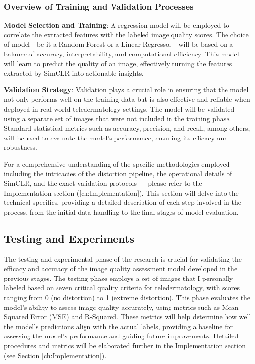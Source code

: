 \subsubsection{Overview of Training and Validation Processes}
\label{subsub:OverciewTrainVal}
\textbf{Model Selection and Training}: A regression model will be employed to correlate the extracted features with the labeled image quality scores. The choice of model—be it a Random Forest or a Linear Regressor—will be based on a balance of accuracy, interpretability, and computational efficiency. This model will learn to predict the quality of an image, effectively turning the features extracted by SimCLR into actionable insights. \par 
\noindent
\textbf{Validation Strategy}: Validation plays a crucial role in ensuring that the model not only performs well on the training data but is also effective and reliable when deployed in real-world teledermatology settings. The model will be validated using a separate set of images that were not included in the training phase. Standard statistical metrics such as accuracy, precision, and recall, among others, will be used to evaluate the model’s performance, ensuring its efficacy and robustness.\par
\vspace{\baselineskip}
\noindent
For a comprehensive understanding of the specific methodologies employed — including the intricacies of the distortion pipeline, the operational details of SimCLR, and the exact validation protocols — please refer to the Implementation section (\autoref{ch:Implementation}). This section will delve into the technical specifics, providing a detailed description of each step involved in the process, from the initial data handling to the final stages of model evaluation. \par 


\subsection{Testing and Experiments}
\label{sub:TestExperiment}
The testing and experimental phase of the research is crucial for validating the efficacy and accuracy of the image quality assessment model developed in the previous stages. The testing phase employs a set of images that I personally labeled based on seven critical quality criteria for teledermatology, with scores ranging from 0 (no distortion) to 1 (extreme distortion). This phase evaluates the model’s ability to assess image quality accurately, using metrics such as Mean Squared Error (MSE) and R-Squared. These metrics will help determine how well the model's predictions align with the actual labels, providing a baseline for assessing the model’s performance and guiding future improvements. Detailed procedures and metrics will be elaborated further in the Implementation section (see Section \autoref{ch:Implementation}).\par 

